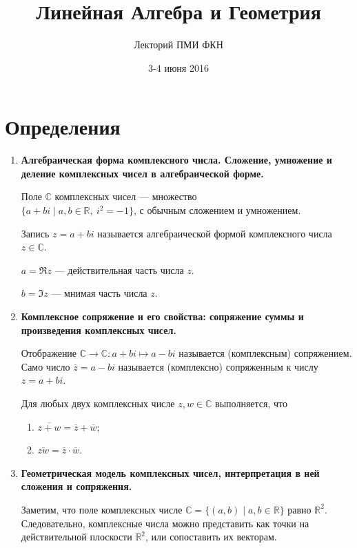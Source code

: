 

\title{Линейная Алгебра и Геометрия}
\author{Лекторий ПМИ ФКН}
\date{3-4 июня 2016}


\maketitle

\section{Определения}

\begin{enumerate}
\item \textbf{Алгебраическая форма комплексного числа. Сложение, умножение и деление комплексных чисел в алгебраической форме.}
 
Поле $\mathbb{C}$ комплексных чисел --- множество \\ $\{a + bi \mid a, b \in \mathbb{R},\ i^2 = -1\}$, с обычным сложением и умножением.

Запись $z = a + bi$ называется алгебраической формой комплексного числа $z \in \mathbb{C}$.

$a = \Re z$ — действительная часть числа $z$.

$b = \Im z$ — мнимая часть числа $z$.
\item \textbf{Комплексное сопряжение и его свойства: сопряжение суммы и произведения комплексных чисел.}

Отображение $\mathbb{C} \rightarrow \mathbb{C} : a + bi \mapsto a - bi$ называется (комплексным) сопряжением. Само число $\overline{z} = a - bi$ называется (комплексно) сопряженным к числу $z = a + bi$. 

Для любых двух комплексных числе $z, w \in \mathbb{C}$ выполняется, что
\begin{enumerate}
\item $\overline{z + w} = \overline{z} + \overline{w}$;
\item $\overline{zw} = \overline{z} \cdot \overline{w}$.
\end{enumerate}
\item \textbf{Геометрическая модель комплексных чисел, интерпретация в ней сложения и сопряжения.}

Заметим, что поле комплексных числе $\mathbb{C} = \{(a, b) \mid a, b \in \mathbb{R}\}$ равно $\mathbb{R}^2$. Следовательно, комплексные числа можно представить как точки на действительной плоскости $\mathbb{R}^2$, или сопоставить их векторам.


\end{enumerate}
